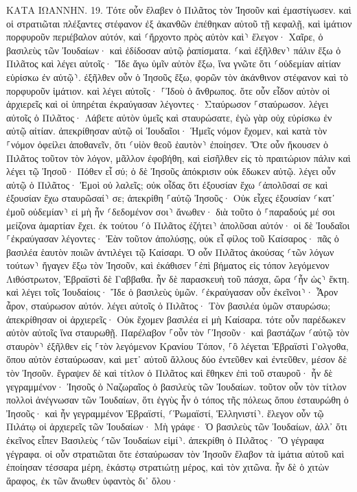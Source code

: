 \documentclass[twoside, 9pt]{extreport}
\begin{document}
ΚΑΤΑ ΙΩΑΝΝΗΝ.
19.
Τότε οὖν ἔλαβεν ὁ Πιλᾶτος τὸν Ἰησοῦν καὶ ἐμαστίγωσεν. 
καὶ οἱ στρατιῶται πλέξαντες στέφανον ἐξ ἀκανθῶν ἐπέθηκαν αὐτοῦ τῇ κεφαλῇ, καὶ ἱμάτιον πορφυροῦν περιέβαλον αὐτόν, 
καὶ ⸂ἤρχοντο πρὸς αὐτὸν καὶ⸃ ἔλεγον· Χαῖρε, ὁ βασιλεὺς τῶν Ἰουδαίων· καὶ ἐδίδοσαν αὐτῷ ῥαπίσματα. 
⸂καὶ ἐξῆλθεν⸃ πάλιν ἔξω ὁ Πιλᾶτος καὶ λέγει αὐτοῖς· Ἴδε ἄγω ὑμῖν αὐτὸν ἔξω, ἵνα γνῶτε ὅτι ⸂οὐδεμίαν αἰτίαν εὑρίσκω ἐν αὐτῷ⸃. 
ἐξῆλθεν οὖν ὁ Ἰησοῦς ἔξω, φορῶν τὸν ἀκάνθινον στέφανον καὶ τὸ πορφυροῦν ἱμάτιον. καὶ λέγει αὐτοῖς· ⸀Ἰδοὺ ὁ ἄνθρωπος. 
ὅτε οὖν εἶδον αὐτὸν οἱ ἀρχιερεῖς καὶ οἱ ὑπηρέται ἐκραύγασαν λέγοντες· Σταύρωσον ⸀σταύρωσον. λέγει αὐτοῖς ὁ Πιλᾶτος· Λάβετε αὐτὸν ὑμεῖς καὶ σταυρώσατε, ἐγὼ γὰρ οὐχ εὑρίσκω ἐν αὐτῷ αἰτίαν. 
ἀπεκρίθησαν αὐτῷ οἱ Ἰουδαῖοι· Ἡμεῖς νόμον ἔχομεν, καὶ κατὰ τὸν ⸀νόμον ὀφείλει ἀποθανεῖν, ὅτι ⸂υἱὸν θεοῦ ἑαυτὸν⸃ ἐποίησεν. 
Ὅτε οὖν ἤκουσεν ὁ Πιλᾶτος τοῦτον τὸν λόγον, μᾶλλον ἐφοβήθη, 
καὶ εἰσῆλθεν εἰς τὸ πραιτώριον πάλιν καὶ λέγει τῷ Ἰησοῦ· Πόθεν εἶ σύ; ὁ δὲ Ἰησοῦς ἀπόκρισιν οὐκ ἔδωκεν αὐτῷ. 
λέγει οὖν αὐτῷ ὁ Πιλᾶτος· Ἐμοὶ οὐ λαλεῖς; οὐκ οἶδας ὅτι ἐξουσίαν ἔχω ⸂ἀπολῦσαί σε καὶ ἐξουσίαν ἔχω σταυρῶσαί⸃ σε; 
ἀπεκρίθη ⸀αὐτῷ Ἰησοῦς· Οὐκ εἶχες ἐξουσίαν ⸂κατ᾽ ἐμοῦ οὐδεμίαν⸃ εἰ μὴ ἦν ⸂δεδομένον σοι⸃ ἄνωθεν· διὰ τοῦτο ὁ ⸀παραδούς μέ σοι μείζονα ἁμαρτίαν ἔχει. 
ἐκ τούτου ⸂ὁ Πιλᾶτος ἐζήτει⸃ ἀπολῦσαι αὐτόν· οἱ δὲ Ἰουδαῖοι ⸀ἐκραύγασαν λέγοντες· Ἐὰν τοῦτον ἀπολύσῃς, οὐκ εἶ φίλος τοῦ Καίσαρος· πᾶς ὁ βασιλέα ἑαυτὸν ποιῶν ἀντιλέγει τῷ Καίσαρι. 
Ὁ οὖν Πιλᾶτος ἀκούσας ⸂τῶν λόγων τούτων⸃ ἤγαγεν ἔξω τὸν Ἰησοῦν, καὶ ἐκάθισεν ⸀ἐπὶ βήματος εἰς τόπον λεγόμενον Λιθόστρωτον, Ἑβραϊστὶ δὲ Γαββαθα. 
ἦν δὲ παρασκευὴ τοῦ πάσχα, ὥρα ⸂ἦν ὡς⸃ ἕκτη. καὶ λέγει τοῖς Ἰουδαίοις· Ἴδε ὁ βασιλεὺς ὑμῶν. 
⸂ἐκραύγασαν οὖν ἐκεῖνοι⸃· Ἆρον ἆρον, σταύρωσον αὐτόν. λέγει αὐτοῖς ὁ Πιλᾶτος· Τὸν βασιλέα ὑμῶν σταυρώσω; ἀπεκρίθησαν οἱ ἀρχιερεῖς· Οὐκ ἔχομεν βασιλέα εἰ μὴ Καίσαρα. 
τότε οὖν παρέδωκεν αὐτὸν αὐτοῖς ἵνα σταυρωθῇ. Παρέλαβον ⸀οὖν τὸν ⸀Ἰησοῦν· 
καὶ βαστάζων ⸂αὑτῷ τὸν σταυρὸν⸃ ἐξῆλθεν εἰς ⸀τὸν λεγόμενον Κρανίου Τόπον, ⸀ὃ λέγεται Ἑβραϊστὶ Γολγοθα, 
ὅπου αὐτὸν ἐσταύρωσαν, καὶ μετ᾽ αὐτοῦ ἄλλους δύο ἐντεῦθεν καὶ ἐντεῦθεν, μέσον δὲ τὸν Ἰησοῦν. 
ἔγραψεν δὲ καὶ τίτλον ὁ Πιλᾶτος καὶ ἔθηκεν ἐπὶ τοῦ σταυροῦ· ἦν δὲ γεγραμμένον· Ἰησοῦς ὁ Ναζωραῖος ὁ βασιλεὺς τῶν Ἰουδαίων. 
τοῦτον οὖν τὸν τίτλον πολλοὶ ἀνέγνωσαν τῶν Ἰουδαίων, ὅτι ἐγγὺς ἦν ὁ τόπος τῆς πόλεως ὅπου ἐσταυρώθη ὁ Ἰησοῦς· καὶ ἦν γεγραμμένον Ἑβραϊστί, ⸂Ῥωμαϊστί, Ἑλληνιστί⸃. 
ἔλεγον οὖν τῷ Πιλάτῳ οἱ ἀρχιερεῖς τῶν Ἰουδαίων· Μὴ γράφε· Ὁ βασιλεὺς τῶν Ἰουδαίων, ἀλλ᾽ ὅτι ἐκεῖνος εἶπεν Βασιλεὺς ⸂τῶν Ἰουδαίων εἰμί⸃. 
ἀπεκρίθη ὁ Πιλᾶτος· Ὃ γέγραφα γέγραφα. 
οἱ οὖν στρατιῶται ὅτε ἐσταύρωσαν τὸν Ἰησοῦν ἔλαβον τὰ ἱμάτια αὐτοῦ καὶ ἐποίησαν τέσσαρα μέρη, ἑκάστῳ στρατιώτῃ μέρος, καὶ τὸν χιτῶνα. ἦν δὲ ὁ χιτὼν ἄραφος, ἐκ τῶν ἄνωθεν ὑφαντὸς δι᾽ ὅλου· 
\end{document}
